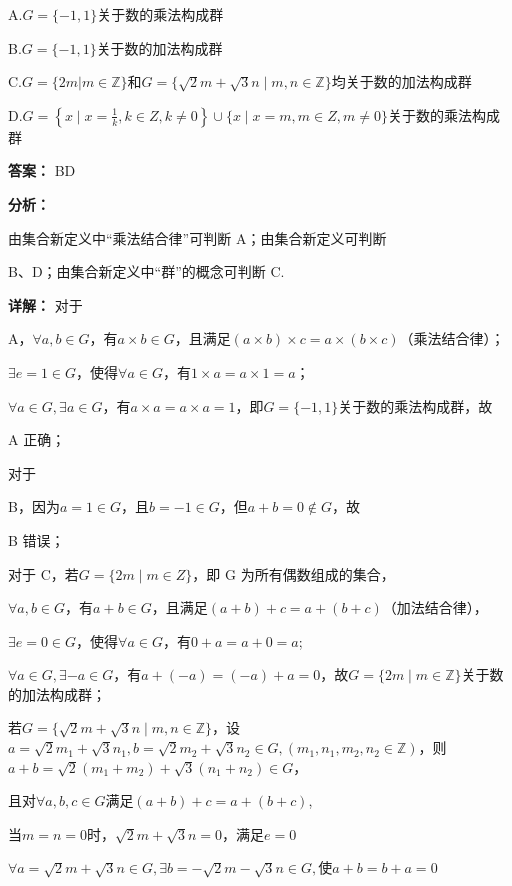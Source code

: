 \documentclass[11pt,a4paper]{ctexart}
\begin{document}
A.\(G = \{-1,1\}\)关于数的乘法构成群

B.\(G = \{-1,1\}\)关于数的加法构成群

C.\(G = \{2m|m\in \mathbb{Z}\}\)和\(G = \{\sqrt{2} m + \sqrt{3} n\mid m,n\in \mathbb{Z}\}\)均关于数的加法构成群

D.\(G = \left\{x \mid x = \frac{1}{k}, k \in Z, k \neq 0\right\} \cup \{x \mid x = m, m \in Z, m \neq 0\}\)关于数的乘法构成群

\textbf{答案：}
BD

\textbf{分析：}

由集合新定义中``乘法结合律''可判断 A；由集合新定义可判断

B、D；由集合新定义中``群''的概念可判断 C.

\textbf{详解：}
对于

A，\(\forall a, b \in G\)，有\(a \times b \in G\)，且满足\((a \times b) \times c = a \times (b \times c)\)（乘法结合律）；

\(\exists e = 1 \in G\)，使得\(\forall a \in G\)，有\(1 \times a = a \times 1 = a\)；

\(\forall a \in G, \exists a \in G\)，有\(a \times a = a \times a = 1\)，即\(G = \{-1, 1\}\)关于数的乘法构成群，故

A 正确；

对于

B，因为\(a = 1 \in G\)，且\(b = -1 \in G\)，但\(a + b = 0 \notin G\)，故

B 错误；

对于 C，若\(G = \{2m \mid m \in Z\}\)，即 G 为所有偶数组成的集合，

\(\forall a, b \in G\)，有\(a + b \in G\)，且满足\((a + b) + c = a + (b + c)\)（加法结合律），

\(\exists e = 0 \in G\)，使得\(\forall a \in G\)，有\(0 + a = a + 0 = a\);

\(\forall a \in G, \exists -a \in G\)，有\(a + (-a) = (-a) + a = 0\)，故\(G = \{2m \mid m \in \mathbb{Z}\}\)关于数的加法构成群；

若\(G = \{\sqrt{2}m + \sqrt{3}n \mid m, n \in \mathbb{Z}\}\)，设\(a = \sqrt{2}m_1 + \sqrt{3}n_1, b = \sqrt{2}m_2 + \sqrt{3}n_2 \in G, (m_1, n_1, m_2, n_2 \in \mathbb{Z})\)，则\(a + b = \sqrt{2}(m_1 + m_2) + \sqrt{3}(n_1 + n_2) \in G\)，

且对\(\forall a, b, c \in G\)满足\((a + b) + c = a + (b + c)\),

当\(m = n = 0\)时，\(\sqrt{2} m + \sqrt{3} n = 0\)，满足\(e = 0\)

\(\forall a = \sqrt{2} m + \sqrt{3} n \in G, \exists b = -\sqrt{2} m - \sqrt{3} n \in G,\)使\(a + b = b + a = 0\)
\end{document}
